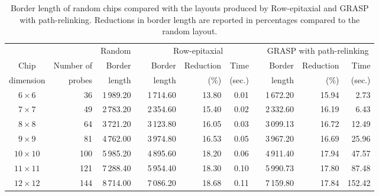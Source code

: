 \documentclass[english]{lni}
\begin{document}
\begin{table}[t]
\caption{Border length of random chips compared with the layouts produced by
Row-epitaxial and GRASP with path-relinking. Reductions in border length are
reported in percentages compared to the random layout.\label{tab:graspr_reptx}}
\vspace*{2ex}
\scriptsize{
\begin{tabular}{crrcrrrcrrr}
          &            & Random & & \multicolumn{3}{c}{Row-epitaxial}  & & \multicolumn{3}{c}{GRASP with path-relinking}  \\ \cline{3-3} \cline{5-7} \cline{9-11}
Chip      & Number of  & Border & & Border & Reduction & Time          & & Border & Reduction & Time   \\
dimension & probes     & length & & length & (\%)      & (sec.)        & & length & (\%)      & (sec.) \\
\hline
$6\times 6$   &  36 & 1\,989.20 & & 1\,714.60 & 13.80 & 0.01 & & 1\,672.20 & 15.94 &   2.73 \\
$7\times 7$   &  49 & 2\,783.20 & & 2\,354.60 & 15.40 & 0.02 & & 2\,332.60 & 16.19 &   6.43 \\
$8\times 8$   &  64 & 3\,721.20 & & 3\,123.80 & 16.05 & 0.03 & & 3\,099.13 & 16.72 &  12.49 \\
$9\times 9$   &  81 & 4\,762.00 & & 3\,974.80 & 16.53 & 0.05 & & 3\,967.20 & 16.69 &  25.96 \\
$10\times 10$ & 100 & 5\,985.20 & & 4\,895.60 & 18.20 & 0.06 & & 4\,911.40 & 17.94 &  47.57 \\
$11\times 11$ & 121 & 7\,288.40 & & 5\,954.40 & 18.30 & 0.10 & & 5\,990.73 & 17.80 &  87.48 \\
$12\times 12$ & 144 & 8\,714.00 & & 7\,086.20 & 18.68 & 0.11 & & 7\,159.80 & 17.84 & 152.42 \\
\hline
\end{tabular}}
\end{table}
\end{document}
